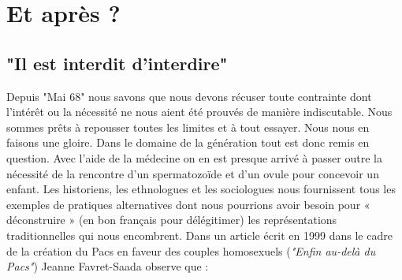 


 \chapter[Et après ?]{Et après ?}


\section{"Il est interdit d'interdire"} 

  Depuis "Mai 68" nous savons que nous devons récuser toute contrainte dont l'intérêt ou la nécessité ne nous aient été prouvés de manière indiscutable. Nous sommes prêts à repousser toutes les limites et à tout essayer. Nous nous en faisons une gloire. Dans le domaine de la génération tout est donc remis en question. Avec l'aide de la médecine on en est presque arrivé à passer outre la nécessité de la rencontre d'un spermatozoïde et d'un ovule pour concevoir un enfant. Les historiens, les ethnologues et les sociologues nous fournissent tous les exemples de pratiques alternatives dont nous pourrions avoir besoin pour « déconstruire » (en bon français pour délégitimer) les représentations traditionnelles qui nous encombrent. Dans un article écrit en 1999 dans le cadre de la création du Pacs en faveur des couples homosexuels (\emph{"Enfin au-delà du Pacs"}) Jeanne Favret-Saada observe que :
